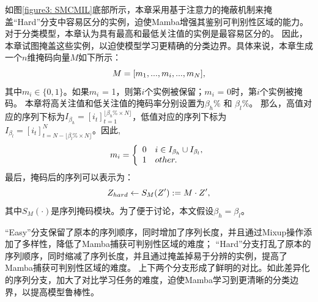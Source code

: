 如图\ref{figure3: SMCMIL}底部所示，本章采用基于注意力的掩蔽机制来掩盖“Hard”分支中容易区分的实例，迫使Mamba增强其鉴别可判别性区域的能力。对于分类模型，本章认为具有最高和最低关注值的实例是最容易区分的。
因此，本章试图掩盖这些实例，以迫使模型学习更精确的分类边界。具体来说，本章生成一个$n$维掩码向量$M$如下所示：
  \begin{equation}
    \mathnormal{M}=[m_1,...,m_i,...,m_N],
    \label{eq11}
    \end{equation}
其中$m_i \in \{0,1\}$。如果$m_i$ = 1，则第$i$个实例被保留；$m_i$ = 0时，第$i$个实例被掩码。
本章将高关注值和低关注值的掩码率分别设置为$\beta_h\%$ 和 $\beta_l\%$。
那么，高值对应的序列下标为$I_{\beta_h}=[i_t]^{\lfloor \beta_h\%\times N \rfloor}_{t=1}$，低值对应的序列下标为 $I_{\beta_l}=[i_t]^{N}_{t=N-\lfloor \beta_l\%\times N \rfloor}$。因此,
\begin{equation}
  \mathnormal{m_i}=\left \{
  \begin{array}{cl}
      0 &  i\in I_{\beta_h} \cup  I_{\beta_l}, \\
      1 & other.
  \end{array}\right.
  \label{eq12}
  \end{equation}
最后，掩码后的序列可以表示为：
\begin{equation}
  \mathnormal{Z_{hard}}\leftarrow S_M(Z'):=M\cdot \mathnormal{Z'},
  \label{eq13}
  \end{equation}
其中$S_M(\cdot)$是序列掩码模块。为了便于讨论，本文假设$\beta_h=\beta_l$。

“Easy”分支保留了原本的序列顺序，同时增加了序列长度，并且通过Mixup操作添加了多样性，降低了Mamba捕获可判别性区域的难度；
“Hard”分支打乱了原本的序列顺序，同时缩减了序列长度，并且通过掩盖掉易于分辨的实例，提高了Mamba捕获可判别性区域的难度。
上下两个分支形成了鲜明的对比。如此差异化的序列分支，加大了对比学习任务的难度，迫使Mamba学习到更清晰的分类边界，以提高模型鲁棒性。

